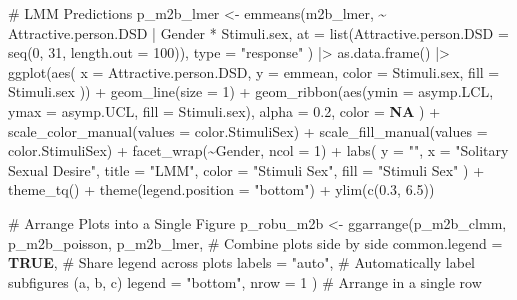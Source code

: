 \documentclass[
  bookmarksnumbered]{article}
\newenvironment{Shaded}{\begin{snugshade}}{\end{snugshade}}
\newcommand{\AttributeTok}[1]{\textcolor[rgb]{0.80,0.80,0.80}{#1}}
\newcommand{\CommentTok}[1]{\textcolor[rgb]{0.50,0.62,0.50}{#1}}
\newcommand{\ConstantTok}[1]{\textcolor[rgb]{0.86,0.64,0.64}{\textbf{#1}}}
\newcommand{\DecValTok}[1]{\textcolor[rgb]{0.86,0.86,0.80}{#1}}
\newcommand{\FloatTok}[1]{\textcolor[rgb]{0.75,0.75,0.82}{#1}}
\newcommand{\FunctionTok}[1]{\textcolor[rgb]{0.94,0.94,0.56}{#1}}
\newcommand{\NormalTok}[1]{\textcolor[rgb]{0.80,0.80,0.80}{#1}}
\newcommand{\OtherTok}[1]{\textcolor[rgb]{0.94,0.94,0.56}{#1}}
\newcommand{\SpecialCharTok}[1]{\textcolor[rgb]{0.86,0.64,0.64}{#1}}
\newcommand{\StringTok}[1]{\textcolor[rgb]{0.80,0.58,0.58}{#1}}
\begin{document}
\begin{Shaded}
\begin{Highlighting}[]
\CommentTok{\# LMM Predictions}
\NormalTok{p\_m2b\_lmer }\OtherTok{\textless{}{-}} \FunctionTok{emmeans}\NormalTok{(m2b\_lmer, }\SpecialCharTok{\textasciitilde{}}\NormalTok{ Attractive.person.DSD }\SpecialCharTok{|}\NormalTok{ Gender }\SpecialCharTok{*}\NormalTok{ Stimuli.sex,}
  \AttributeTok{at =} \FunctionTok{list}\NormalTok{(}\AttributeTok{Attractive.person.DSD =} \FunctionTok{seq}\NormalTok{(}\DecValTok{0}\NormalTok{, }\DecValTok{31}\NormalTok{, }\AttributeTok{length.out =} \DecValTok{100}\NormalTok{)),}
  \AttributeTok{type =} \StringTok{"response"}
\NormalTok{) }\SpecialCharTok{|\textgreater{}}
  \FunctionTok{as.data.frame}\NormalTok{() }\SpecialCharTok{|\textgreater{}}
  \FunctionTok{ggplot}\NormalTok{(}\FunctionTok{aes}\NormalTok{(}
    \AttributeTok{x =}\NormalTok{ Attractive.person.DSD, }\AttributeTok{y =}\NormalTok{ emmean,}
    \AttributeTok{color =}\NormalTok{ Stimuli.sex, }\AttributeTok{fill =}\NormalTok{ Stimuli.sex}
\NormalTok{  )) }\SpecialCharTok{+}
  \FunctionTok{geom\_line}\NormalTok{(}\AttributeTok{size =} \DecValTok{1}\NormalTok{) }\SpecialCharTok{+}
  \FunctionTok{geom\_ribbon}\NormalTok{(}\FunctionTok{aes}\NormalTok{(}\AttributeTok{ymin =}\NormalTok{ asymp.LCL, }\AttributeTok{ymax =}\NormalTok{ asymp.UCL, }\AttributeTok{fill =}\NormalTok{ Stimuli.sex),}
    \AttributeTok{alpha =} \FloatTok{0.2}\NormalTok{, }\AttributeTok{color =} \ConstantTok{NA}
\NormalTok{  ) }\SpecialCharTok{+}
  \FunctionTok{scale\_color\_manual}\NormalTok{(}\AttributeTok{values =}\NormalTok{ color.StimuliSex) }\SpecialCharTok{+}
  \FunctionTok{scale\_fill\_manual}\NormalTok{(}\AttributeTok{values =}\NormalTok{ color.StimuliSex) }\SpecialCharTok{+}
  \FunctionTok{facet\_wrap}\NormalTok{(}\SpecialCharTok{\textasciitilde{}}\NormalTok{Gender, }\AttributeTok{ncol =} \DecValTok{1}\NormalTok{) }\SpecialCharTok{+}
  \FunctionTok{labs}\NormalTok{(}
    \AttributeTok{y =} \StringTok{""}\NormalTok{, }\AttributeTok{x =} \StringTok{"Solitary Sexual Desire"}\NormalTok{,}
    \AttributeTok{title =} \StringTok{"LMM"}\NormalTok{,}
    \AttributeTok{color =} \StringTok{"Stimuli Sex"}\NormalTok{, }\AttributeTok{fill =} \StringTok{"Stimuli Sex"}
\NormalTok{  ) }\SpecialCharTok{+}
  \FunctionTok{theme\_tq}\NormalTok{() }\SpecialCharTok{+}
  \FunctionTok{theme}\NormalTok{(}\AttributeTok{legend.position =} \StringTok{"bottom"}\NormalTok{) }\SpecialCharTok{+}
  \FunctionTok{ylim}\NormalTok{(}\FunctionTok{c}\NormalTok{(}\FloatTok{0.3}\NormalTok{, }\FloatTok{6.5}\NormalTok{))}

\CommentTok{\# Arrange Plots into a Single Figure}
\NormalTok{p\_robu\_m2b }\OtherTok{\textless{}{-}} \FunctionTok{ggarrange}\NormalTok{(p\_m2b\_clmm, p\_m2b\_poisson, p\_m2b\_lmer, }\CommentTok{\# Combine plots side by side}
  \AttributeTok{common.legend =} \ConstantTok{TRUE}\NormalTok{, }\CommentTok{\# Share legend across plots}
  \AttributeTok{labels =} \StringTok{"auto"}\NormalTok{, }\CommentTok{\# Automatically label subfigures (a, b, c)}
  \AttributeTok{legend =} \StringTok{"bottom"}\NormalTok{,}
  \AttributeTok{nrow =} \DecValTok{1}
\NormalTok{) }\CommentTok{\# Arrange in a single row}


\end{Highlighting}
\end{Shaded}
\end{document}
